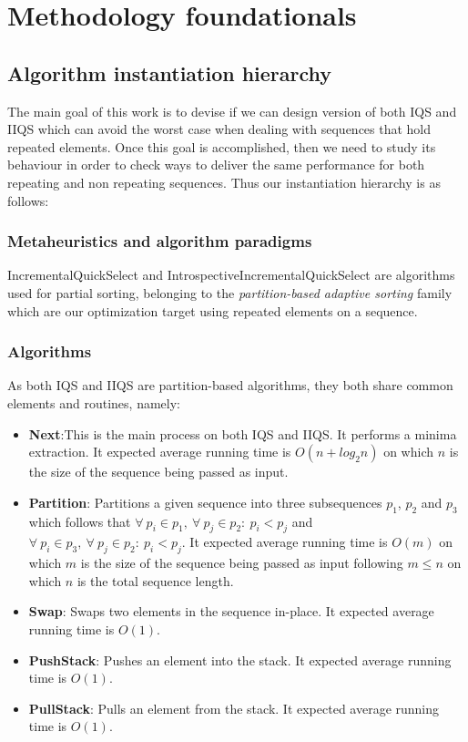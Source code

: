 \section{Methodology foundationals}
\label{SECTION:METHODOLOGY_FOUNDATIONALS}

\subsection{Algorithm instantiation hierarchy}
The main goal of this work is to devise if we can design version of both IQS and IIQS which can avoid the worst case when dealing with sequences that hold repeated elements. Once this goal is accomplished, then we need to study its behaviour in order to check ways to deliver the same performance for both repeating and non repeating sequences. Thus our instantiation hierarchy is as follows:\\

\subsubsection{Metaheuristics and algorithm paradigms}
IncrementalQuickSelect and IntrospectiveIncrementalQuickSelect are algorithms used for partial sorting, belonging to the \textit{partition-based adaptive sorting} family which are our optimization target using repeated elements on a sequence.\\

\subsubsection{Algorithms}
As both IQS and IIQS are partition-based algorithms, they both share common elements and routines, namely:\\

\begin{itemize}
    \item \textbf{Next}:This is the main process on both IQS and IIQS. It performs a minima extraction. It expected average running time is $O(n + log_2{n})$ on which $n$ is the size of the sequence being passed as input.
    \item \textbf{Partition}: Partitions a given sequence into three subsequences $p_1$, $p_2$ and $p_3$ which follows that $\forall~p_i \in p_1,~\forall~p_j \in p_2:~ p_i < p_j$ and $\forall~p_i \in p_3,~\forall~p_j \in p_2:~p_i < p_j$. It expected average running time is $O(m)$ on which $m$ is the size of the sequence being passed as input following $m \leq n$ on which $n$ is the total sequence length.
    \item \textbf{Swap}: Swaps two elements in the sequence in-place. It expected average running time is $O(1)$.
    \item \textbf{PushStack}: Pushes an element into the stack. It expected average running time is $O(1)$.
    \item \textbf{PullStack}: Pulls an element from the stack. It expected average running time is $O(1)$.
\end{itemize}

